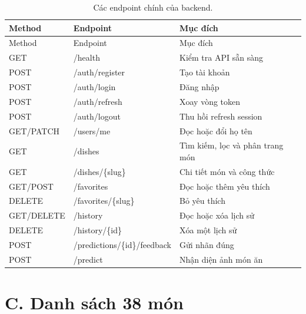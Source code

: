 \begin{longtable}{p{3.0cm}p{5.2cm}p{5.9cm}}
\caption{Các endpoint chính của backend.}\label{tab:api-list}\\
\toprule Method & Endpoint & Mục đích \\
\midrule \endfirsthead
\toprule Method & Endpoint & Mục đích \\
\midrule \endhead
GET & /health & Kiểm tra API sẵn sàng \\
POST & /auth/register & Tạo tài khoản \\
POST & /auth/login & Đăng nhập \\
POST & /auth/refresh & Xoay vòng token \\
POST & /auth/logout & Thu hồi refresh session \\
GET/PATCH & /users/me & Đọc hoặc đổi họ tên \\
GET & /dishes & Tìm kiếm, lọc và phân trang món \\
GET & /dishes/\{slug\} & Chi tiết món và công thức \\
GET/POST & /favorites & Đọc hoặc thêm yêu thích \\
DELETE & /favorites/\{slug\} & Bỏ yêu thích \\
GET/DELETE & /history & Đọc hoặc xóa lịch sử \\
DELETE & /history/\{id\} & Xóa một lịch sử \\
POST & /predictions/\{id\}/feedback & Gửi nhãn đúng \\
POST & /predict & Nhận diện ảnh món ăn \\
\bottomrule
\end{longtable}

\section*{C. Danh sách 38 món}
{}

